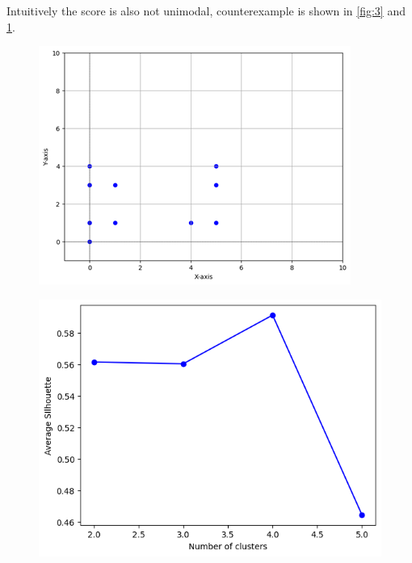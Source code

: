 \documentclass{article}
\begin{document}
Intuitively the score is also not unimodal, counterexample is shown in \ref{fig:3} and \ref{fig:4}.

\begin{figure}[htbp]
    \centering
    \begin{minipage}{0.45\linewidth}
        \centering
        \includegraphics[width=\linewidth]{ex2.png}
        \label{fig:3}
    \end{minipage}
    \hfill
    \begin{minipage}{0.45\linewidth}
        \centering
        \includegraphics[width=\linewidth]{plot2.png}
        \label{fig:4}
    \end{minipage}
\end{figure}
\end{document}
